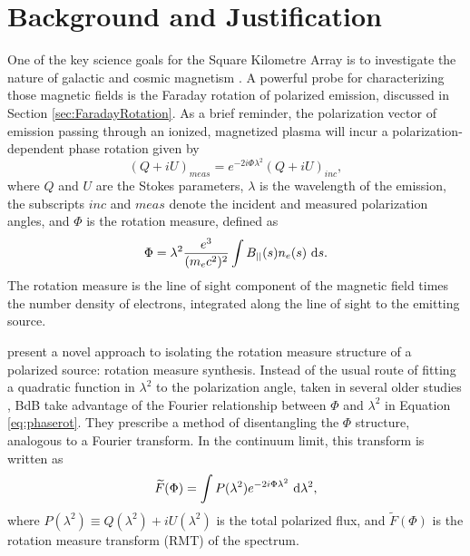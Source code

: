 \section{Background and Justification}

One of the key science goals for the Square Kilometre Array is to investigate the nature of galactic
and cosmic magnetism \cite[][e.g.]{Beck2013b}. A powerful probe for characterizing those magnetic fields is the Faraday
rotation of polarized emission, discussed in Section \ref{sec:FaradayRotation}. As a brief reminder,
the polarization vector of emission passing through an ionized, magnetized plasma will incur a
polarization-dependent phase rotation given by 
\begin{equation}
  (Q + iU)_{meas} = e^{-2i\Phi\lambda^2}(Q+iU)_{inc},
  \label{eq:phaserot}
\end{equation}
where $Q$ and $U$ are the Stokes parameters, $\lambda$ is the wavelength of the emission, the
subscripts $inc$ and $meas$ denote the incident and measured polarization angles, and $\Phi$ is the
rotation measure, defined as
\begin{equation}
  \Phi = \lambda^2 \frac{e^3}{(m_ec^2)^2}\int B_{||}(s)n_e(s)\ \mathrm{d}s.
\end{equation}
The rotation measure is the line of sight component of the magnetic field times the number density
of electrons, integrated along the line of sight to the emitting source.

\citet[][abbreviated to BdB]{BrentjensDeBruyn} present a novel approach to isolating the rotation
measure structure of a polarized source: rotation measure synthesis. Instead of the usual route of 
fitting a quadratic function in $\lambda^2$ to the polarization angle, taken in several older studies
\cite[][e.g.]{Taylor2009}, BdB take advantage of the Fourier relationship between $\Phi$ and
$\lambda^2$ in Equation \ref{eq:phaserot}. They prescribe a method of disentangling the $\Phi$
structure, analogous to a Fourier transform. In the continuum limit, this transform is written as 
\begin{equation}
  \widetilde{F}(\Phi) = \int P(\lambda^2)e^{-2i\Phi\lambda^2}\ \mathrm{d}\lambda^2,
  \label{eq:rmt_continuum}
\end{equation}
where $P(\lambda^2)\equiv Q(\lambda^2)+iU(\lambda^2)$ is the total polarized flux, and
$\widetilde{F}(\Phi)$ is the rotation measure transform
(RMT) of the spectrum.

